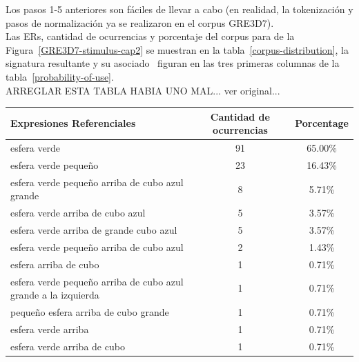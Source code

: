 Los pasos 1-5 anteriores son f\'aciles de llevar a cabo (en realidad, la tokenizaci\'on y
pasos de normalizaci\'on ya se realizaron en el corpus GRE3D7). \\
Las ERs, cantidad de ocurrencias y porcentaje del corpus para de la Figura~\ref{GRE3D7-stimulus-cap2} se muestran en la tabla~\ref{corpus-distribution}, la signatura resultante y su asociado \puse\ figuran en las tres primeras columnas de la tabla~\ref{probability-of-use}.\\

ARREGLAR ESTA TABLA HABIA UNO MAL... ver original...
\begin{table}[h!]
\begin{center}
\begin{tabular}{|l|c|c|}
\hline
Expresiones Referenciales & Cantidad de ocurrencias & Porcentage \\
\hline

esfera verde & 91 & 65.00\% \\
esfera verde peque\~no  & 23 & 16.43\% \\
esfera verde peque\~no arriba de cubo azul grande & 8 & 5.71\% \\
esfera verde arriba de cubo azul & 5 & 3.57\% \\
esfera verde arriba de grande cubo azul & 5 & 3.57\% \\
esfera verde peque\~no arriba de cubo azul & 2 & 1.43\% \\
esfera arriba de cubo & 1 & 0.71\% \\
esfera verde peque\~no arriba de cubo azul grande a la izquierda & 1 & 0.71\% \\
peque\~no esfera arriba de cubo grande & 1 & 0.71\% \\
esfera verde arriba & 1 & 0.71\% \\
esfera verde arriba de cubo & 1 & 0.71\% \\




\end{tabular}
\end{center}
\end{table}
